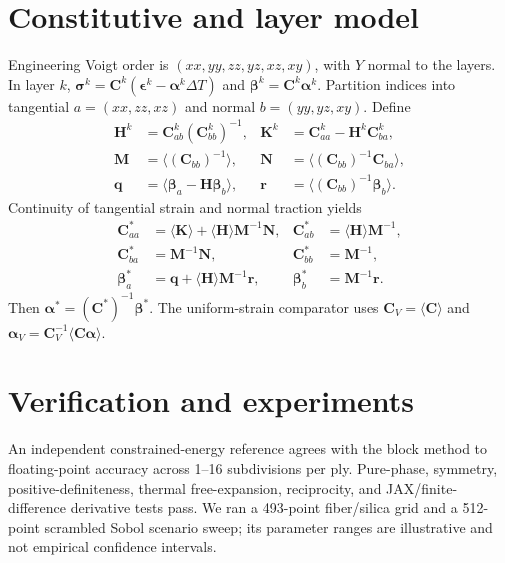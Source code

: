 \documentclass[11pt]{article}
\begin{document}
\section{Constitutive and layer model}
Engineering Voigt order is $(xx,yy,zz,yz,xz,xy)$, with $Y$ normal to the
layers. In layer $k$, $\boldsymbol\sigma^k=\mathbf C^k
(\boldsymbol\epsilon^k-\boldsymbol\alpha^k\Delta T)$ and
$\boldsymbol\beta^k=\mathbf C^k\boldsymbol\alpha^k$.
Partition indices into tangential $a=(xx,zz,xz)$ and normal
$b=(yy,yz,xy)$. Define
\begin{align}
\mathbf H^k&=\mathbf C^k_{ab}(\mathbf C^k_{bb})^{-1}, &
\mathbf K^k&=\mathbf C^k_{aa}-\mathbf H^k\mathbf C^k_{ba},\\
\mathbf M&=\langle(\mathbf C_{bb})^{-1}\rangle, &
\mathbf N&=\langle(\mathbf C_{bb})^{-1}\mathbf C_{ba}\rangle,\\
\mathbf q&=\langle\boldsymbol\beta_a-\mathbf H\boldsymbol\beta_b\rangle, &
\mathbf r&=\langle(\mathbf C_{bb})^{-1}\boldsymbol\beta_b\rangle.
\end{align}
Continuity of tangential strain and normal traction yields
\begin{align}
\mathbf C^*_{aa}&=\langle\mathbf K\rangle+\langle\mathbf H\rangle\mathbf M^{-1}\mathbf N,
&\mathbf C^*_{ab}&=\langle\mathbf H\rangle\mathbf M^{-1},\\
\mathbf C^*_{ba}&=\mathbf M^{-1}\mathbf N,
&\mathbf C^*_{bb}&=\mathbf M^{-1},\\
\boldsymbol\beta^*_a&=\mathbf q+\langle\mathbf H\rangle\mathbf M^{-1}\mathbf r,
&\boldsymbol\beta^*_b&=\mathbf M^{-1}\mathbf r.
\end{align}
Then $\boldsymbol\alpha^*=(\mathbf C^*)^{-1}\boldsymbol\beta^*$.
The uniform-strain comparator uses $\mathbf C_V=\langle\mathbf C\rangle$
and $\boldsymbol\alpha_V=\mathbf C_V^{-1}\langle\mathbf C\boldsymbol\alpha\rangle$.

\section{Verification and experiments}
An independent constrained-energy reference agrees with the block method
to floating-point accuracy across 1--16 subdivisions per ply. Pure-phase,
symmetry, positive-definiteness, thermal free-expansion, reciprocity, and
JAX/finite-difference derivative tests pass. We ran a 493-point
fiber/silica grid and a 512-point scrambled Sobol scenario sweep; its
parameter ranges are illustrative and not empirical confidence intervals.
\end{document}
